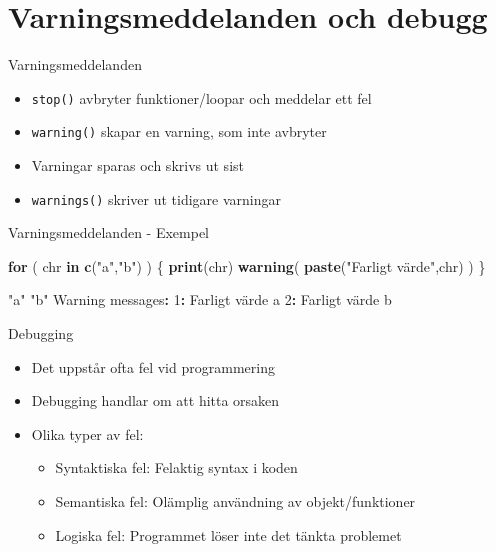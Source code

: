 \documentclass[
  11pt,
  ignorenonframetext,
]{beamer}
\newenvironment{Shaded}{\begin{snugshade}}{\end{snugshade}}
\newcommand{\ControlFlowTok}[1]{\textcolor[rgb]{0.13,0.29,0.53}{\textbf{#1}}}
\newcommand{\DecValTok}[1]{\textcolor[rgb]{0.00,0.00,0.81}{#1}}
\newcommand{\FunctionTok}[1]{\textcolor[rgb]{0.13,0.29,0.53}{\textbf{#1}}}
\newcommand{\NormalTok}[1]{#1}
\newcommand{\SpecialCharTok}[1]{\textcolor[rgb]{0.81,0.36,0.00}{\textbf{#1}}}
\newcommand{\StringTok}[1]{\textcolor[rgb]{0.31,0.60,0.02}{#1}}
\providecommand{\tightlist}{%
  \setlength{\itemsep}{0pt}\setlength{\parskip}{0pt}}
\begin{document}
\section{Varningsmeddelanden och
debugg}\label{varningsmeddelanden-och-debugg}

\begin{frame}{Varningsmeddelanden}
\label{varningsmeddelanden}
\begin{itemize}
\tightlist
\item
  \texttt{stop()} avbryter funktioner/loopar och meddelar ett fel
\item
  \texttt{warning()} skapar en varning, som inte avbryter
\item
  Varningar sparas och skrivs ut sist
\item
  \texttt{warnings()} skriver ut tidigare varningar
\end{itemize}
\end{frame}

\begin{frame}[fragile]{Varningsmeddelanden - Exempel}
\label{varningsmeddelanden---exempel}
\begin{Shaded}
\begin{Highlighting}[]
\ControlFlowTok{for}\NormalTok{ ( chr }\ControlFlowTok{in} \FunctionTok{c}\NormalTok{(}\StringTok{"a"}\NormalTok{,}\StringTok{"b"}\NormalTok{) ) \{}
  \FunctionTok{print}\NormalTok{(chr)}
  \FunctionTok{warning}\NormalTok{( }\FunctionTok{paste}\NormalTok{(}\StringTok{"Farligt värde"}\NormalTok{,chr) )}
\NormalTok{\}}
\end{Highlighting}
\end{Shaded}

\pause

\begin{Shaded}
\begin{Highlighting}[]
\StringTok{"a"}
\StringTok{"b"}
\NormalTok{Warning messages}\SpecialCharTok{:}
\DecValTok{1}\SpecialCharTok{:}\NormalTok{ Farligt värde a }
\DecValTok{2}\SpecialCharTok{:}\NormalTok{ Farligt värde b }
\end{Highlighting}
\end{Shaded}
\end{frame}

\begin{frame}{Debugging}
\label{debugging}
\begin{itemize}
\tightlist
\item
  Det uppstår ofta fel vid programmering
\item
  Debugging handlar om att hitta orsaken
\item
  Olika typer av fel:

  \begin{itemize}
  \tightlist
  \item
    Syntaktiska fel: Felaktig syntax i koden
  \item
    Semantiska fel: Olämplig användning av objekt/funktioner
  \item
    Logiska fel: Programmet löser inte det tänkta problemet
  \end{itemize}
\end{itemize}
\end{frame}
\end{document}

